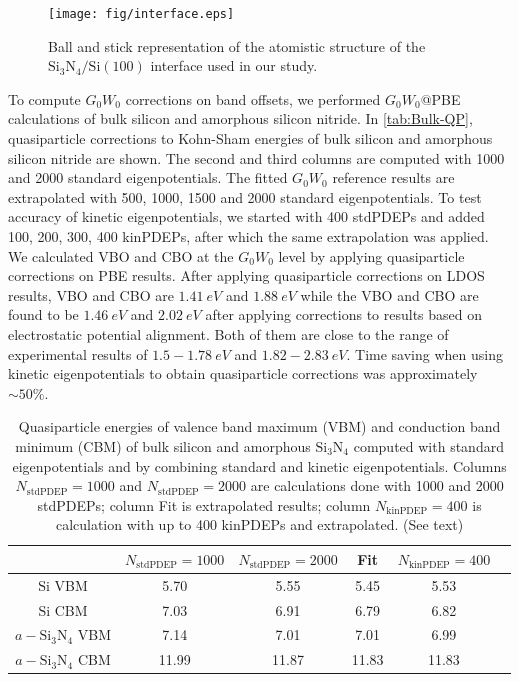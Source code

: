 \documentclass[aip,preprint]{revtex4-1}
\begin{document}
	\begin{figure}
		\centering
		\texttt{[image: fig/interface.eps]}
		\caption{Ball and stick representation of the atomistic structure\cite{Anh2013interface} of the $\mathrm{Si_3N_4/Si(100)}$ interface used in our study.}\label{fig:interface_structure}
	\end{figure}
	
	To compute $G_0W_0$ corrections on band offsets, we performed $G_0W_0$@PBE calculations of bulk silicon and amorphous silicon nitride. In \autoref{tab:Bulk-QP}, quasiparticle corrections to Kohn-Sham energies of bulk silicon and amorphous silicon nitride are shown. The second and third columns are computed with 1000 and 2000 standard eigenpotentials. The fitted $G_0W_0$ reference results are extrapolated with 500, 1000, 1500 and 2000 standard eigenpotentials. To test accuracy of kinetic eigenpotentials, we started with 400 stdPDEPs and added 100, 200, 300, 400 kinPDEPs, after which the same extrapolation was applied. We calculated VBO and CBO at the $G_0W_0$ level by applying quasiparticle corrections on PBE results. After applying quasiparticle corrections on LDOS results, VBO and CBO are $\SI{1.41}{\si{eV}}$ and $\SI{1.88}{\si{eV}}$ while the VBO and CBO are found to be $\SI{1.46}{\si{eV}}$ and $\SI{2.02}{\si{eV}}$ after applying corrections to results based on electrostatic potential alignment. Both of them are close to the range of experimental results of $1.5-\SI{1.78}{\si{eV}}$ and $1.82-\SI{2.83}{\si{eV}}$. Time saving when using kinetic eigenpotentials to obtain quasiparticle corrections was approximately $\sim 50\%$.

    \begin{table}
        \centering
        \caption{Quasiparticle energies of valence band maximum (VBM) and conduction band minimum (CBM) of bulk silicon and amorphous $\mathrm{Si_3N_4}$ computed with standard eigenpotentials and by combining standard and kinetic eigenpotentials. Columns $N_\mathrm{stdPDEP}=1000$ and $N_\mathrm{stdPDEP}=2000$ are calculations done with 1000 and 2000 stdPDEPs; column Fit is extrapolated results; column $N_\mathrm{kinPDEP} = 400$ is calculation with up to 400 kinPDEPs and extrapolated. (See text) }
        \begin{tabular}{c|ccccc}
        \hline\hline
                          & $N_\mathrm{stdPDEP}=1000$ & $N_\mathrm{stdPDEP}=2000$ & Fit & $N_\mathrm{kinPDEP} = 400$ & \\
        \hline
            $\mathrm{Si}$ VBM        & 5.70  & 5.55  & 5.45  &  5.53 \\
            $\mathrm{Si}$ CBM        & 7.03  & 6.91  & 6.79  &  6.82 \\
            $a-\mathrm{Si_3N_4}$ VBM & 7.14  & 7.01  & 7.01  &  6.99 \\
            $a-\mathrm{Si_3N_4}$ CBM & 11.99 & 11.87 & 11.83 & 11.83 \\
        \hline\hline
        \end{tabular}
        \label{tab:Bulk-QP}
    \end{table}
\end{document}
